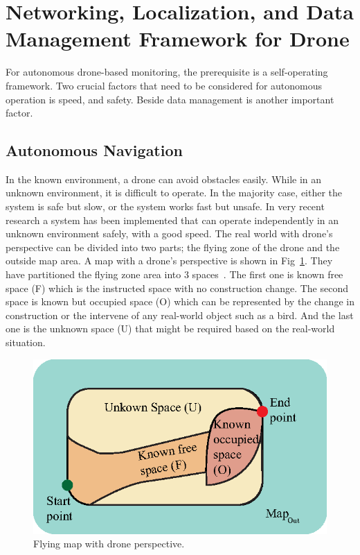 \section{Networking, Localization, and Data Management Framework for Drone}
\label{networkingsection}

For autonomous drone-based monitoring, the prerequisite is a self-operating framework.
Two crucial factors that need to be considered for autonomous operation is speed, and safety. Beside data management is another important factor.

\subsection{Autonomous Navigation}
In the known environment, a drone can avoid obstacles easily. While in an unknown environment, it is difficult to operate. In the majority case, either the system is safe but slow, or the system works fast but unsafe. In very recent research a system has been implemented that can operate independently in an unknown environment safely, with a good speed. The real world with drone's perspective can be divided into two parts; the flying zone of the drone and the outside map area. A map with a drone's perspective is shown in Fig~\ref{autonomous}. They have partitioned the flying zone area into 3 spaces~\cite{tordesillas2019real, tordesillas2019faster}. The first one is known free space (F) which is the instructed space with no construction change. The second space is known but occupied space (O) which can be represented by the change in construction or the intervene of any real-world object such as a bird. And the last one is the unknown space (U) that might be required based on the real-world situation.
\begin{figure}[h!]
\centering
\includegraphics[width=.8\linewidth]{figure/autonomous.eps}
\caption{Flying map with drone perspective.}
\label{autonomous}
\end{figure}

